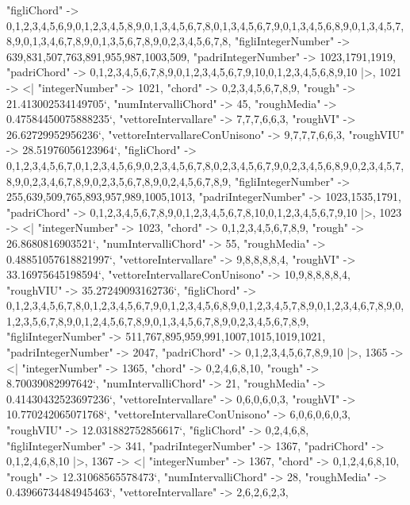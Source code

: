 \documentclass[
]{article}
\begin{document}
\begin{DatasetVerbatim}
    "figliChord" -> {{0,1,2,3,4,5,6,9},{0,1,2,3,4,5,8,9},{0,1,3,4,5,6,7,8},{0,1,3,4,5,6,7,9},{0,1,3,4,5,6,8,9},{0,1,3,4,5,7,8,9},{0,1,3,4,6,7,8,9},{0,1,3,5,6,7,8,9},{0,2,3,4,5,6,7,8}},
    "figliIntegerNumber" -> {639,831,507,763,891,955,987,1003,509},
    "padriIntegerNumber" -> {1023,1791,1919},
    "padriChord" -> {{0,1,2,3,4,5,6,7,8,9},{0,1,2,3,4,5,6,7,9,10},{0,1,2,3,4,5,6,8,9,10}}
  |>,
  1021 -> <|
    "integerNumber" -> 1021,
    "chord" -> {0,2,3,4,5,6,7,8,9},
    "rough" -> 21.413002534149705`,
    "numIntervalliChord" -> 45,
    "roughMedia" -> 0.47584450075888235`,
    "vettoreIntervallare" -> {7,7,7,6,6,3},
    "roughVI" -> 26.62729952956236`,
    "vettoreIntervallareConUnisono" -> {9,7,7,7,6,6,3},
    "roughVIU" -> 28.51976056123964`,
    "figliChord" -> {{0,1,2,3,4,5,6,7},{0,1,2,3,4,5,6,9},{0,2,3,4,5,6,7,8},{0,2,3,4,5,6,7,9},{0,2,3,4,5,6,8,9},{0,2,3,4,5,7,8,9},{0,2,3,4,6,7,8,9},{0,2,3,5,6,7,8,9},{0,2,4,5,6,7,8,9}},
    "figliIntegerNumber" -> {255,639,509,765,893,957,989,1005,1013},
    "padriIntegerNumber" -> {1023,1535,1791},
    "padriChord" -> {{0,1,2,3,4,5,6,7,8,9},{0,1,2,3,4,5,6,7,8,10},{0,1,2,3,4,5,6,7,9,10}}
  |>,
  1023 -> <|
    "integerNumber" -> 1023,
    "chord" -> {0,1,2,3,4,5,6,7,8,9},
    "rough" -> 26.8680816903521`,
    "numIntervalliChord" -> 55,
    "roughMedia" -> 0.48851057618821997`,
    "vettoreIntervallare" -> {9,8,8,8,8,4},
    "roughVI" -> 33.16975645198594`,
    "vettoreIntervallareConUnisono" -> {10,9,8,8,8,8,4},
    "roughVIU" -> 35.27249093162736`,
    "figliChord" -> {{0,1,2,3,4,5,6,7,8},{0,1,2,3,4,5,6,7,9},{0,1,2,3,4,5,6,8,9},{0,1,2,3,4,5,7,8,9},{0,1,2,3,4,6,7,8,9},{0,1,2,3,5,6,7,8,9},{0,1,2,4,5,6,7,8,9},{0,1,3,4,5,6,7,8,9},{0,2,3,4,5,6,7,8,9}},
    "figliIntegerNumber" -> {511,767,895,959,991,1007,1015,1019,1021},
    "padriIntegerNumber" -> {2047},
    "padriChord" -> {{0,1,2,3,4,5,6,7,8,9,10}}
  |>,
  1365 -> <|
    "integerNumber" -> 1365,
    "chord" -> {0,2,4,6,8,10},
    "rough" -> 8.70039082997642`,
    "numIntervalliChord" -> 21,
    "roughMedia" -> 0.41430432523697236`,
    "vettoreIntervallare" -> {0,6,0,6,0,3},
    "roughVI" -> 10.770242065071768`,
    "vettoreIntervallareConUnisono" -> {6,0,6,0,6,0,3},
    "roughVIU" -> 12.031882752856617`,
    "figliChord" -> {{0,2,4,6,8}},
    "figliIntegerNumber" -> {341},
    "padriIntegerNumber" -> {1367},
    "padriChord" -> {{0,1,2,4,6,8,10}}
  |>,
  1367 -> <|
    "integerNumber" -> 1367,
    "chord" -> {0,1,2,4,6,8,10},
    "rough" -> 12.31068565578473`,
    "numIntervalliChord" -> 28,
    "roughMedia" -> 0.43966734484945463`,
    "vettoreIntervallare" -> {2,6,2,6,2,3},

\end{DatasetVerbatim}
\end{document}
